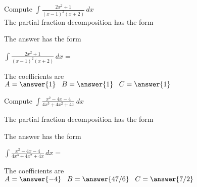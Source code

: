 \documentclass{ximera}
\begin{document}
\begin{problem}

Compute $\displaystyle{\int \frac{2x^2 + 1}{(x-1)^2(x+2)}\, dx}$\\

The partial fraction decomposition has the form

\begin{multipleChoice}
\end{multipleChoice}



The answer has the form

$\displaystyle{\int \frac{2x^2 + 1}{(x-1)^2(x+2)} \, dx =}$
\begin{multipleChoice}
\end{multipleChoice}

The coefficients are\\
$A = \answer{1} \;\;\; B = \answer{1} \;\;\; C = \answer{1}$
\end{problem}




\begin{problem}

Compute $\displaystyle{\int \frac{x^2 - 4x - 4}{4x^3 + 4x^2 + 4x} \, dx}$

The partial fraction decomposition has the form

\begin{multipleChoice}
\end{multipleChoice}



The answer has the form

$\displaystyle{\int \frac{x^2 - 4x - 4}{4x^3 + 4x^2 + 4x} \, dx =}$
\begin{multipleChoice}
\end{multipleChoice}

The coefficients are\\
$A = \answer{-4} \;\;\; B = \answer{47/6} \;\;\; C = \answer{7/2}$
\end{problem}
\end{document}
